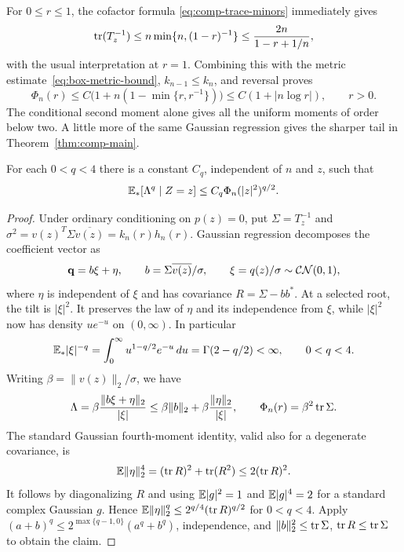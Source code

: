 For $0\le r\le1$, the cofactor formula
\eqref{eq:comp-trace-minors} immediately gives
\begin{equation}\label{eq:comp-trace-bound}
  \operatorname{tr}(T_z^{-1})
  \le n\min\{n,(1-r)^{-1}\}
  \le\frac{2n}{1-r+1/n},
\end{equation}
with the usual interpretation at $r=1$.  Combining this with
the metric estimate~\eqref{eq:box-metric-bound}, $k_{n-1}\le k_n$, and reversal proves
\begin{equation}\label{eq:comp-depth-bound}
  \Phi_n(r)\le C\bigl(1+n(1-\min\{r,r^{-1}\})\bigr)
  \le C(1+|n\log r|),\qquad r>0.
\end{equation}
The conditional second moment alone gives all the uniform moments of
order below two.  A little more of the same Gaussian regression gives
the sharper tail in Theorem~\ref{thm:comp-main}.

\begin{lemma}\label{lem:comp-third}
For each $0<q<4$ there is a constant $C_q$, independent of $n$ and $z$, such that
\[
  \mathbb E_*[\Lambda^q\mid Z=z]\le C_q\Phi_n(|z|^2)^{q/2}.
\]
\end{lemma}

\begin{proof}
Under ordinary conditioning on $p(z)=0$, put $\Sigma=T_z^{-1}$ and
$\sigma^2=v(z)^T\Sigma\overline{v(z)}=k_n(r)h_n(r)$.  Gaussian
regression decomposes the coefficient vector as
\[
  \mathbf q=b\xi+\eta,
  \qquad b=\Sigma\overline{v(z)}/\sigma,
  \qquad \xi=q(z)/\sigma\sim\mathcal{CN}(0,1),
\]
where $\eta$ is independent of $\xi$ and has covariance
$R=\Sigma-bb^*$.  At a selected root, the tilt is $|\xi|^2$.
It preserves the law of $\eta$ and its independence from $\xi$, while
$|\xi|^2$ now has density $u e^{-u}$ on $(0,\infty)$.  In particular
\[
  \mathbb E_*|\xi|^{-q}
    =\int_0^\infty u^{1-q/2}e^{-u}\,du
    =\Gamma(2-q/2)<\infty,\qquad 0<q<4.
\]
Writing $\beta=\|v(z)\|_2/\sigma$, we have
\[
  \Lambda=\beta\frac{\|b\xi+\eta\|_2}{|\xi|}
  \le\beta\|b\|_2+\beta\frac{\|\eta\|_2}{|\xi|},
  \qquad \Phi_n(r)=\beta^2\operatorname{tr}\Sigma.
\]
The standard Gaussian fourth-moment identity, valid also for a
degenerate covariance, is
\[
  \mathbb E\|\eta\|_2^4=(\operatorname{tr} R)^2+\operatorname{tr}(R^2)\le2(\operatorname{tr} R)^2.
\]
It follows by diagonalizing $R$ and using $\mathbb E|g|^2=1$ and
$\mathbb E|g|^4=2$ for a standard complex Gaussian $g$.
Hence $\mathbb E\|\eta\|_2^q\le2^{q/4}(\operatorname{tr} R)^{q/2}$ for $0<q<4$.  Apply
$(a+b)^q\le2^{\max\{q-1,0\}}(a^q+b^q)$, independence, and
$\|b\|_2^2\le\operatorname{tr}\Sigma$, $\operatorname{tr} R\le\operatorname{tr}\Sigma$ to obtain the claim.
\end{proof}

